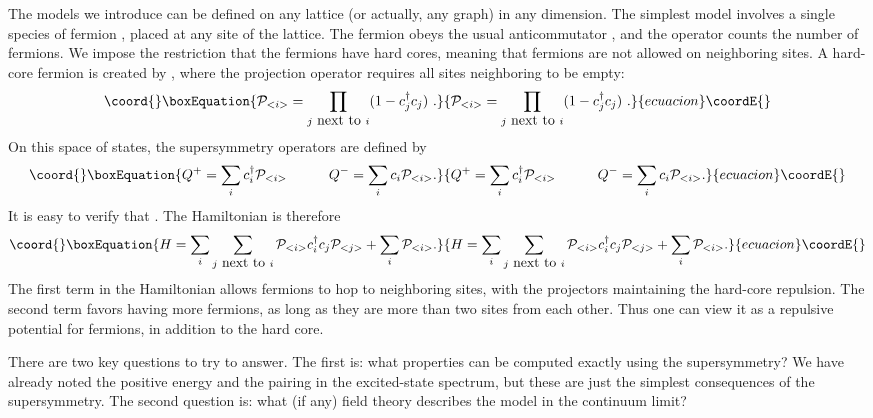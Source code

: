 \documentclass[a4paper,prl,aps,twocolumn]{revtex4}
\begin{document}
The models we introduce can be defined on any lattice
(or actually, any graph) in any dimension. The simplest model involves
a single species of fermion \coordHE{}, placed at any site \coordHE{} of the
lattice. The fermion obeys the usual anticommutator
\coordHE{}, and the operator \coordHE{} counts the number of fermions.  We impose the
restriction that the fermions have hard cores, meaning that fermions
are not allowed on neighboring sites.
A hard-core fermion is created by
\coordHE{}, where the projection
operator \coordHE{} requires all sites
neighboring \coordHE{} to be empty:
\begin{equation}\coord{}\boxEquation{  
{\cal P}_{<i>}= \prod_{j\hbox{ next to } i} (1-c^\dagger_j c_j) \ .  
}{  
{\cal P}_{<i>}= \prod_{j\hbox{ next to } i} (1-c^\dagger_j c_j) \ .  
}{ecuacion}\coordE{}\end{equation}  
On this space of states, the supersymmetry
operators are defined by
\begin{equation}\coord{}\boxEquation{  
Q^+=\sum_i c^\dagger_i {\cal P}_{<i>} \qquad\quad  
Q^-=\sum_i c_i {\cal P}_{<i>}.  
\label{susydef}  
}{  
Q^+=\sum_i c^\dagger_i {\cal P}_{<i>} \qquad\quad  
Q^-=\sum_i c_i {\cal P}_{<i>}.  
}{ecuacion}\coordE{}\end{equation}  
It is easy to verify that \coordHE{}.
The Hamiltonian is therefore
\begin{equation}\coord{}\boxEquation{  
H= \sum_i \sum_{j\hbox{ next to }i} {\cal P}_{<i>} c^\dagger_i   
c_j {\cal P}_{<j>} + \sum_i {\cal P}_{<i>}.
\label{ham}  
}{  
H= \sum_i \sum_{j\hbox{ next to }i} {\cal P}_{<i>} c^\dagger_i   
c_j {\cal P}_{<j>} + \sum_i {\cal P}_{<i>}.
}{ecuacion}\coordE{}\end{equation}
The first term in the Hamiltonian allows fermions to hop to
neighboring sites, with the projectors maintaining the hard-core
repulsion. The second term favors having more fermions, as long
as they are more than two sites from each other. Thus one can
view it as a repulsive potential for fermions, 
in addition to the hard core.
  
There are two key questions to try to answer. The first is:
what properties can be computed exactly using the supersymmetry? 
We have already noted the positive energy and 
the pairing in the excited-state spectrum,
but these are just the simplest consequences of the supersymmetry.
The second question is: what (if any) field theory
describes the model in the continuum limit?
\end{document}

